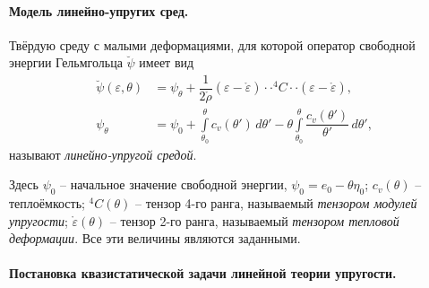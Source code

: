
\paragraph{Модель линейно-упругих сред.}
\begin{definition}
  Твёрдую среду с малыми деформациями, для которой оператор свободной энергии Гельмгольца
  $\breve{\psi}$ имеет вид
  \begin{align*}
    \breve{\psi}(\varepsilon, \theta) &= \psi_\theta + \dfrac{1}{2\mathring{\rho}} (\varepsilon - \mathring{\varepsilon}) \cdot\cdot {}^4 C \cdot\cdot (\varepsilon - \mathring{\varepsilon}), \\
    \psi_\theta &= \psi_0 + \int\limits_{\theta_0}^\theta c_v(\theta') \, d\theta' - \theta \int\limits_{\theta_0}^\theta \dfrac{c_v(\theta')}{\theta'} \, d\theta',
  \end{align*}
  называют \emph{линейно-упругой средой}.

  Здесь $\psi_0$ -- начальное значение свободной энергии, $\psi_0 = e_0 - \theta \eta_0$;
  $c_v(\theta)$ -- теплоёмкость;
  ${}^4 C (\theta)$ -- тензор 4-го ранга, называемый \emph{тензором модулей упругости};
  $\mathring{\varepsilon}(\theta)$ -- тензор 2-го ранга, называемый \emph{тензором тепловой деформации}.
  Все эти величины являются заданными.
\end{definition}


\paragraph{Постановка квазистатической задачи линейной теории упругости.}

